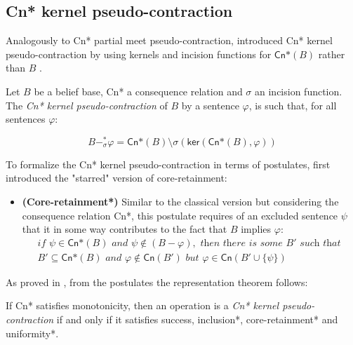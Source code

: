 \subsection{\textsf{Cn*} kernel pseudo-contraction}
\label{subsec:kernel-pseudo-contraction}

Analogously to \textsf{Cn*} partial meet pseudo-contraction, \citeauthor{Matos2021} introduced \textsf{Cn*} kernel pseudo-contraction by using kernels and incision functions for $\textsf{Cn*}(B)$ rather than $B$ \citep{Matos2021}.
\begin{definition}
    Let $B$ be a belief base, \textsf{Cn*} a consequence relation and $\sigma$ an incision function. The \textit{\textsf{Cn*} kernel pseudo-contraction} of $B$ by a sentence $\varphi$, is such that, for all sentences $\varphi$:

    $$B -_{\sigma}^{*} \varphi = \textsf{Cn*}(B) \setminus \sigma(\textsf{ker}(\textsf{Cn*}(B), \varphi))$$
\end{definition}

To formalize the \textsf{Cn*} kernel pseudo-contraction in terms of postulates, \citeauthor{Matos2021} first introduced the "starred" version of core-retainment:

\begin{itemize}
    \item[] \textbf{(Core-retainment*)} Similar to the classical version but considering the consequence relation \textsf{Cn*}, this postulate requires of an excluded sentence $\psi$ that it in some way contributes to the fact that $B$ implies $\varphi$:
    \begin{equation*}
        \begin{split}
            \textit{if } \psi \in \textsf{Cn*}(B) \textit{ and } \psi \notin (B - \varphi), \textit{ then there is some } B' \textit{ such that } \\
            B' \subseteq \textsf{Cn*}(B) \textit{ and } \varphi \notin \textsf{Cn}(B') \textit{ but } \varphi \in \textsf{Cn}(B' \cup \{ \psi \}) 
        \end{split}
    \end{equation*}
\end{itemize}

As proved in \citet{Matos2021}, from the postulates the representation theorem follows:

\begin{theorem}
    If \textsf{Cn*} satisfies monotonicity, then an operation is a \textit{\textsf{Cn*} kernel pseudo-contraction} if and only if it satisfies success, inclusion*, core-retainment* and uniformity*.
\end{theorem}

